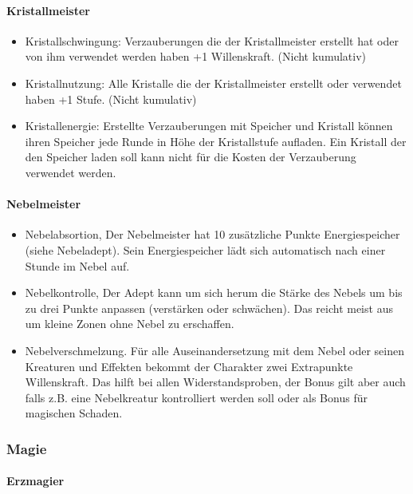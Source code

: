 \documentclass{article}
\begin{document}
\paragraph{Kristallmeister}

\begin{itemize}
\item Kristallschwingung: Verzauberungen die der Kristallmeister erstellt hat oder von ihm verwendet werden haben +1 Willenskraft. (Nicht kumulativ)
\item Kristallnutzung: Alle Kristalle die der Kristallmeister erstellt oder verwendet haben +1 Stufe. (Nicht kumulativ)
\item Kristallenergie: Erstellte Verzauberungen mit Speicher und Kristall können ihren Speicher jede Runde in Höhe der Kristallstufe aufladen. Ein Kristall der den Speicher laden soll kann nicht für die Kosten der Verzauberung verwendet werden.
\end{itemize}

\paragraph{Nebelmeister}

\begin{itemize}
\item Nebelabsortion, Der Nebelmeister hat 10 zusätzliche Punkte Energiespeicher (siehe Nebeladept). Sein Energiespeicher lädt sich automatisch nach einer Stunde im Nebel auf.
\item Nebelkontrolle, Der Adept kann um sich herum die Stärke des Nebels um bis zu drei Punkte anpassen (verstärken oder schwächen). Das reicht meist aus um kleine Zonen ohne Nebel zu erschaffen.
\item Nebelverschmelzung. Für alle Auseinandersetzung mit dem Nebel oder seinen Kreaturen und Effekten bekommt der Charakter zwei Extrapunkte Willenskraft. Das hilft bei allen Widerstandsproben, der Bonus gilt aber auch falls z.B. eine Nebelkreatur kontrolliert werden soll oder als Bonus für magischen Schaden.
\end{itemize}

\subsubsection{Magie}

\paragraph{Erzmagier }
\end{document}
